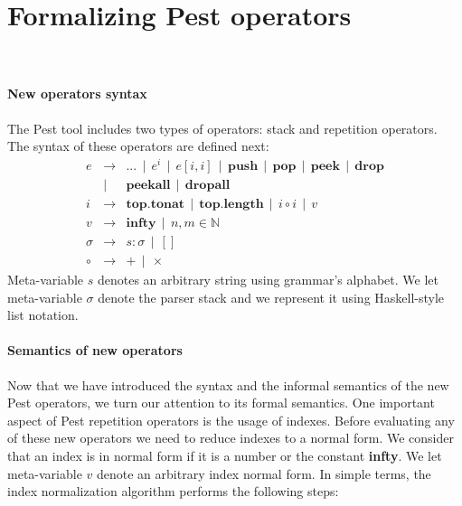 \documentclass[preprint,12pt]{elsarticle}
\theoremstyle{definition}
\begin{document}
\section{Formalizing Pest operators}~\label{sec:pest-formalization}


\paragraph{New operators syntax}
The Pest tool includes two types of operators: stack and repetition operators.
The syntax of these operators are defined next:
\[
\begin{array}{lcl}
  e & \to  & ...\,\mid\,e^i\,\mid\,e[i,i]\,\mid\,\mathbf{push}\,\mid\,\mathbf{pop}\,\mid\,\mathbf{peek}
             \,\mid\,\mathbf{drop}\\
    & \mid & \mathbf{peekall}\,\mid\,\mathbf{dropall}\\
  i & \to  & \mathbf{top.tonat}\,\mid\,\mathbf{top.length}\,\mid\,i \circ i\,\mid\,v\\
  v & \to  & \mathbf{infty}\,\mid\,n,m\in\mathbb{N}\\
  \sigma & \to & s : \sigma\,\mid\,[] \\
  \circ & \to & + \,\mid\, \times
\end{array}
\]
Meta-variable $s$ denotes an arbitrary string using grammar's alphabet.
We let meta-variable $\sigma$ denote the parser stack and we represent it
using Haskell-style list notation.

\paragraph{Semantics of new operators}
Now that we have introduced the syntax and the informal semantics of the new Pest
operators, we turn our attention to its formal semantics. One important aspect
of Pest repetition operators is the usage of indexes. Before evaluating any
of these new operators we need to reduce indexes to a normal form.
We consider that an index is in normal form if it is a number or the constant
\textbf{infty}. We let meta-variable $v$ denote an arbitrary index normal form.
In simple terms, the index normalization algorithm performs the following steps:
\end{document}
